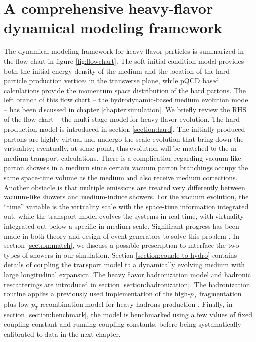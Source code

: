 \chapter{A comprehensive heavy-flavor dynamical modeling framework}
\label{chapter:coupling}
The dynamical modeling framework for heavy flavor particles is summarized in the flow chart in figure \ref{fig:flowchart}.
The soft initial condition model provides both the initial energy density of the medium and the location of the hard particle production vertices in the transverse plane, while pQCD based calculations provide the momentum space distribution of the hard partons.
The left branch of this flow chart -- the hydrodynamic-based medium evolution model -- has been discussed in chapter \ref{chapter:simulation}.
We briefly review the RHS of the flow chart -- the multi-stage model for heavy-flavor evolution.
The hard production model is introduced in section \ref{section:hard}.
The initially produced partons are highly virtual and undergo the scale evolution that bring down the virtuality; eventually, at some point, this evolution will be matched to the in-medium transport calculations.
There is a complication regarding vacuum-like parton showers in a medium since certain vacuum parton branchings occupy the same space-time volume as the medium and also receive medium corrections.
Another obstacle is that multiple emissions are treated very differently between vacuum-like showers and medium-induce showers.
For the vacuum evolution, the ``time'' variable is the virtuality scale with the space-time information integrated out, while the transport model evolves the systems in real-time, with virtuality integrated out below a specific in-medium scale.
Significant progress has been made in both theory and design of event-generators to solve this problem \cite{MehtarTani:2012cy,Mehtar-Tani:2017ypq,Cao:2017zih,Kauder:2018cdt,Putschke:2019yrg,PhysRevLett.120.232001,Caucal:2018ofz}.
In section \ref{section:match}, we discuss a possible prescription to interface the two types of showers in our simulation.
Section \ref{section:couple-to-hydro} contains details of coupling the transport model to a dynamically evolving medium with large longitudinal expansion.
The heavy flavor hadronization model and hadronic rescatterings are introduced in section \ref{section:hadronization}.
The hadronization routine applies a previously used implementation \cite{Cao:2013ita} of the high-$p_T$ fragmentation plus low-$p_T$ recombination model for heavy hadrons production \cite{Oh:2009zj}.
Finally, in section \ref{section:benchmark}, the model is benchmarked using a few values of fixed coupling constant and running coupling constants, before being systematically calibrated to data in the next chapter.

